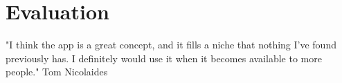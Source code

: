 \chapter{Evaluation}




"I think the app is a great concept, and it fills a niche that nothing I've found previously has. I definitely would use it when it becomes available to more people." Tom Nicolaides

